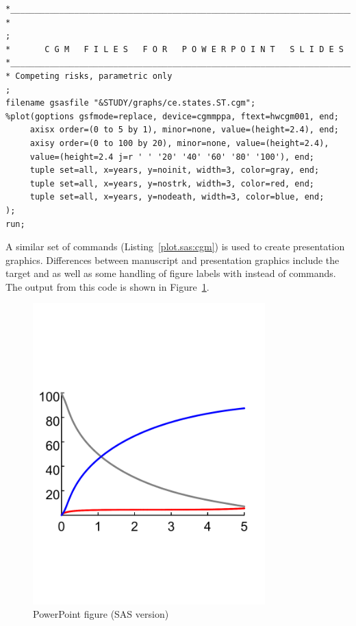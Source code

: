 \documentclass[nojss, letterpaper]{jss}\usepackage[]{graphicx}\usepackage[]{color}
\begin{document}
\begin{lstlisting}[float,floatplacement=!htpb, caption={plot.sas commands: PowerPoint graphics using CGM instructions.}, label={plot.sas:cgm}]
*____________________________________________________________________________;
*                                                                            ;
*       C G M   F I L E S   F O R   P O W E R P O I N T   S L I D E S
*____________________________________________________________________________;
* Competing risks, parametric only                                           ;
filename gsasfile "&STUDY/graphs/ce.states.ST.cgm";
%plot(goptions gsfmode=replace, device=cgmmppa, ftext=hwcgm001, end;
     axisx order=(0 to 5 by 1), minor=none, value=(height=2.4), end;
     axisy order=(0 to 100 by 20), minor=none, value=(height=2.4), 
     value=(height=2.4 j=r ' ' '20' '40' '60' '80' '100'), end;
     tuple set=all, x=years, y=noinit, width=3, color=gray, end;
     tuple set=all, x=years, y=nostrk, width=3, color=red, end;
     tuple set=all, x=years, y=nodeath, width=3, color=blue, end;
);
run;  
\end{lstlisting}

A similar set of  commands (Listing~\ref{plot.sas:cgm}) is used to create presentation graphics.
Differences between manuscript and presentation graphics include the target  and  as well as some handling of figure labels with  instead of  commands. The output from this code is shown in Figure~\ref{F:sasPowerPoint}. 

\begin{figure}[!htpb]
\centering
\includegraphics[width=0.8\textwidth]{../inst/ceStatesST_ppt.pdf}
\caption{PowerPoint figure (SAS version)}
\label{F:sasPowerPoint}
\end{figure}
\end{document}
